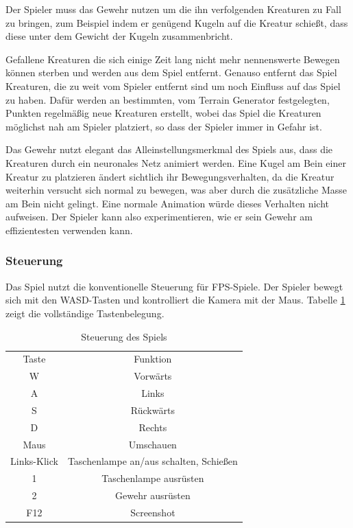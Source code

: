 Der Spieler muss das Gewehr nutzen um die ihn verfolgenden Kreaturen zu Fall zu bringen, zum Beispiel indem er genügend Kugeln auf die Kreatur schießt, dass diese unter dem Gewicht der Kugeln zusammenbricht.

Gefallene Kreaturen die sich einige Zeit lang nicht mehr nennenswerte Bewegen können sterben und werden aus dem Spiel entfernt.
Genauso entfernt das Spiel Kreaturen, die zu weit vom Spieler entfernt sind um noch Einfluss auf das Spiel zu haben.
Dafür werden an bestimmten, vom Terrain Generator festgelegten, Punkten regelmäßig neue Kreaturen erstellt, wobei das Spiel die Kreaturen möglichst nah am Spieler platziert, so dass der Spieler immer in Gefahr ist.

Das Gewehr nutzt elegant das Alleinstellungsmerkmal des Spiels aus, dass die Kreaturen durch ein neuronales Netz animiert werden.
Eine Kugel am Bein einer Kreatur zu platzieren ändert sichtlich ihr Bewegungsverhalten, da die Kreatur weiterhin versucht sich normal zu bewegen, was aber durch die zusätzliche Masse am Bein nicht gelingt.
Eine normale Animation würde dieses Verhalten nicht aufweisen.
Der Spieler kann also experimentieren, wie er sein Gewehr am effizientesten verwenden kann.

\subsubsection{Steuerung}

Das Spiel nutzt die konventionelle Steuerung für FPS-Spiele.
Der Spieler bewegt sich mit den WASD-Tasten und kontrolliert die Kamera mit der Maus. 
Tabelle \ref{tab:controls} zeigt die vollständige Tastenbelegung.

\begin{table}[]
    \centering
\begin{tabular}{c|c}
    Taste & Funktion \\
    W & Vorwärts\\
    A & Links\\
    S & Rückwärts\\
    D & Rechts\\
    Maus & Umschauen\\
    Links-Klick & Taschenlampe an/aus schalten, Schießen\\
    1 & Taschenlampe ausrüsten\\
    2 & Gewehr ausrüsten\\
    F12 & Screenshot
\end{tabular}
    \caption{Steuerung des Spiels}
    \label{tab:controls}
\end{table}

